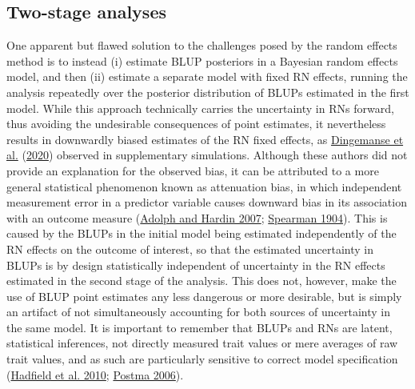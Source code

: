 \documentclass{article}
\begin{document}
\hypertarget{two-stage-analyses}{%
\subsection{Two-stage analyses}\label{two-stage-analyses}}

One apparent but flawed solution to the challenges posed by the random
effects method is to instead (i) estimate BLUP posteriors in a Bayesian
random effects model, and then (ii) estimate a separate model with fixed
RN effects, running the analysis repeatedly over the posterior
distribution of BLUPs estimated in the first model. While this approach
technically carries the uncertainty in RNs forward, thus avoiding the
undesirable consequences of point estimates, it nevertheless results in
downwardly biased estimates of the RN fixed effects, as
\protect\hyperlink{ref-Ding2020b}{Dingemanse et al.}
(\protect\hyperlink{ref-Ding2020b}{2020}) observed in supplementary
simulations. Although these authors did not provide an explanation for
the observed bias, it can be attributed to a more general statistical
phenomenon known as attenuation bias, in which independent measurement
error in a predictor variable causes downward bias in its association
with an outcome measure (\protect\hyperlink{ref-Adolf2007}{Adolph and
Hardin 2007}; \protect\hyperlink{ref-Spearman1904}{Spearman 1904}). This
is caused by the BLUPs in the initial model being estimated
independently of the RN effects on the outcome of interest, so that the
estimated uncertainty in BLUPs is by design statistically independent of
uncertainty in the RN effects estimated in the second stage of the
analysis. This does not, however, make the use of BLUP point estimates
any less dangerous or more desirable, but is simply an artifact of not
simultaneously accounting for both sources of uncertainty in the same
model. It is important to remember that BLUPs and RNs are latent,
statistical inferences, not directly measured trait values or mere
averages of raw trait values, and as such are particularly sensitive to
correct model specification
(\protect\hyperlink{ref-Hadfield2010}{Hadfield et al. 2010};
\protect\hyperlink{ref-Postma2006}{Postma 2006}).
\end{document}
